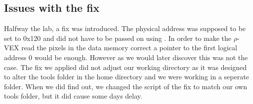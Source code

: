\subsection{Issues with the fix}
\label{sec:fix}
Halfway the lab, a fix was introduced. The physical address was supposed to be set to 0x120 and did not have to be passed on using . In order to make the $\rho$-VEX read the pixels in the data memory correct a pointer to the first logical address 0 would be enough. However as we would later discover this was not the case. The fix we applied did not adjust our working directory as it was designed to alter the tools folder in the home directory and we were working in a seperate folder. When we did find out, we changed the script of the fix to match our own tools folder, but it did cause some days delay. 

